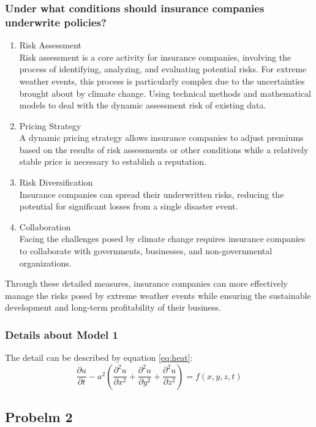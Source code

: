 \documentclass[12pt]{ctexart}
\begin{document}
\subsubsection{Under what conditions should insurance companies underwrite policies?}

\begin{enumerate}[\bfseries 1.]
	\item Risk Assessment\\
	Risk assessment is a core activity for insurance companies, 
	involving the process of identifying, analyzing, and evaluating potential risks. 
	For extreme weather events, 
	this process is particularly complex due to the uncertainties brought about by climate change.
	Using technical methods and mathematical models to deal with the dynamic assessment risk of existing data.
	\item Pricing Strategy\\
	A dynamic pricing strategy allows insurance companies to adjust premiums 
	based on the results of risk assessments or other conditions 
	while a relatively stable price is necessary to establish a reputation.
	\item Risk Diversification\\
	Insurance companies can spread their underwritten risks, 
	reducing the potential for significant losses from a single disaster event.
	\item Collaboration\\
	Facing the challenges posed by climate change requires insurance companies 
	to collaborate with governments, businesses, and non-governmental organizations.
\end{enumerate}
Through these detailed measures, insurance companies can more effectively manage the risks posed by extreme weather events 
while ensuring the sustainable development and long-term profitability of their business.
\subsubsection{Details about Model 1}
The detail can be described by equation \eqref{eq:heat}:
\begin{equation}\label{eq:heat}
	\frac{\partial u}{\partial t} - a^2 \left( \frac{\partial^2 u}{\partial x^2} + \frac{\partial^2 u}{\partial y^2} + \frac{\partial^2 u}{\partial z^2} \right) = f(x, y, z, t)
\end{equation}

\subsection{Probelm 2}
\end{document}
